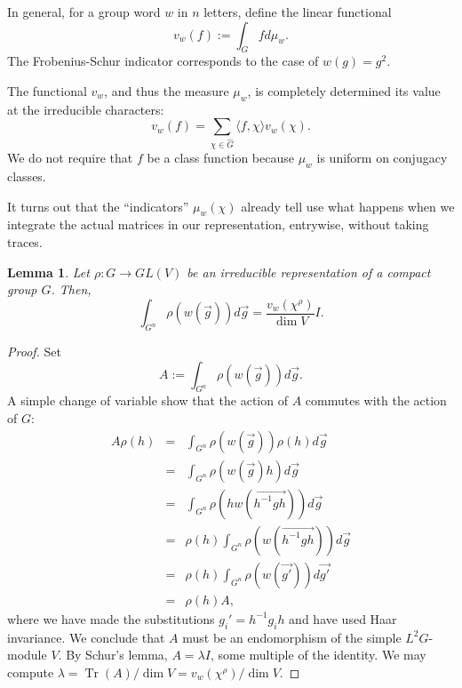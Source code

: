 \documentclass[12pt]{article}
\newtheorem{lem}[thm]{Lemma}
\newcommand{\be}{\begin{equation}}
\newcommand{\ee}{\end{equation}}
\newcommand{\bea}{\begin{eqnarray}}
\newcommand{\eea}{\end{eqnarray}}
\newcommand{\nn}{\nonumber}
\DeclareMathOperator{\Tr}{Tr}
\begin{document}
In general, for a group word $w$ in $n$ letters, define the linear functional
\be 
v_w(f) := \int_G f d\mu_w.
\ee
The Frobenius-Schur indicator corresponds to the case of $w(g) = g^2$.

The functional $v_w$, and thus the measure $\mu_w$, is completely determined its value at the irreducible characters:
\be\label{determined} 
v_w(f) = \sum_{\chi \in \hat{G}} \langle f, \chi \rangle v_w(\chi).
\ee
We do not require that $f$ be a class function because $\mu_w$ is uniform on conjugacy classes.

It turns out that the ``indicators'' $\mu_w(\chi)$ already tell use what happens when we integrate the actual matrices in our representation, entrywise, without taking traces.
\begin{lem}\label{wordconj}
Let $\rho : G \to GL(V)$ be an irreducible representation of a compact group $G$.  Then,
\be 
\int_{G^n} \rho(w(\vec{g}))d\vec{g} = \frac{v_w(\chi^\rho)}{\dim{V}} I.
\ee
\end{lem}
\begin{proof}
Set
\be 
A := \int_{G^n} \rho(w(\vec{g}))d\vec{g}.
\ee
A simple change of variable show that the action of $A$ commutes with the action of $G$:
\bea
A \rho(h) &=& \int_{G^n} \rho(w(\vec{g}))\rho(h)d\vec{g}\nn\\
          &=& \int_{G^n} \rho(w(\vec{g})h)d\vec{g}\nn\\
          &=& \int_{G^n} \rho(hw(\vec{h^{-1}gh}))d\vec{g}\nn\\
          &=& \rho(h) \int_{G^n} \rho(w(\vec{h^{-1}gh}))d\vec{g}\nn\\
          &=& \rho(h) \int_{G^n} \rho(w(\vec{g'}))d\vec{g'}\nn\\
          &=& \rho(h) A,
\eea
where we have made the substitutions $g_i' = h^{-1}g_ih$ and have used Haar invariance.  We conclude that $A$ must be an endomorphism of the simple $L^2 G$-module $V$.  By Schur's lemma, $A=\lambda I$, some multiple of the identity.  We may compute $\lambda = \Tr(A)/\dim{V} = v_w(\chi^\rho)/\dim{V}$.
\end{proof}
\end{document}
